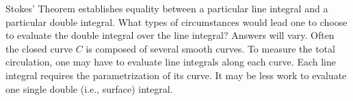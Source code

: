 {Stokes' Theorem establishes equality between a particular line integral and a particular double integral. What types of circumstances would lead one to choose to evaluate the double integral over the line integral? 
}
{Answers will vary. Often the closed curve $C$ is composed of several smooth curves. To measure the total circulation, one may have to evaluate line integrals along each curve. Each line integral requires the parametrization of its curve. It may be less work to evaluate one single double (i.e., surface) integral.
}
